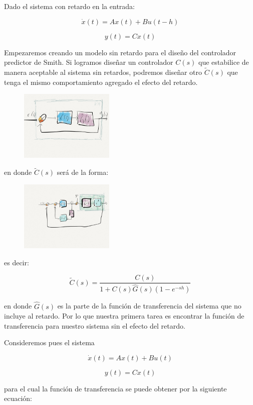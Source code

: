 \documentclass{article}
\begin{document}
    Dado el sistema con retardo en la entrada:

\[
\dot{x}(t) = A x(t) + B u(t - h)
\]

\[
y(t) = C x(t)
\]

Empezaremos creando un modelo sin retardo para el diseño del controlador
predictor de Smith. Si logramos diseñar un controlador \(C(s)\) que
estabilice de manera aceptable al sistema sin retardos, podremos diseñar
otro \(\tilde{C}(s)\) que tenga el mismo comportamiento agregado el
efecto del retardo.

\begin{figure}[h!]
\centering
\includegraphics[width=0.4\textwidth]{../imagenes/1.png}
\end{figure}

en donde \(\tilde{C}(s)\) será de la forma:

\begin{figure}[h!]
\centering
\includegraphics[width=0.4\textwidth]{../imagenes/2.png}
\end{figure}

es decir:

\[
\tilde{C}(s) = \frac{C(s)}{1 + C(s) \hat{G}(s) \left( 1 - e^{-sh} \right)}
\]

en donde \(\hat{G}(s)\) es la parte de la función de transferencia del
sistema que no incluye al retardo. Por lo que nuestra primera tarea es
encontrar la función de transferencia para nuestro sistema sin el efecto
del retardo.

Consideremos pues el sistema

\[
\dot{x}(t) = A x(t) + B u(t)
\]

\[
y(t) = C x(t)
\]

para el cual la función de transferencia se puede obtener por la
siguiente ecuación:
\end{document}
